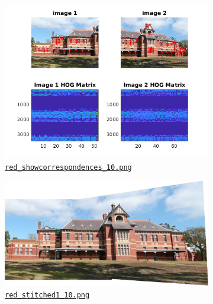 \begin{figure}[htbp]
\begin{subfigure}[t]{0.4\textwidth}
		\includegraphics[width=\textwidth]{hw2/problem3/red_showcorrespondences_10.png}
		\caption{\href{./hw2/problem3/red_showcorrespondences_10.png}{\texttt{red\_showcorrespondences\_10.png}}}\label{fig:8c}
	\end{subfigure}
	\qquad
	\begin{subfigure}[t]{0.4\textwidth}
	    \centering
		\includegraphics[width=\textwidth]{hw2/problem3/red_stitched1_10.png}
		\caption{\href{./hw2/problem3/red_stitched1_10.png}{\texttt{red\_stitched1\_10.png}}}\label{fig:8d}
	\end{subfigure}
	\begin{subfigure}[t]{0.4\textwidth}
	    \centering

\end{subfigure}
\end{figure}

